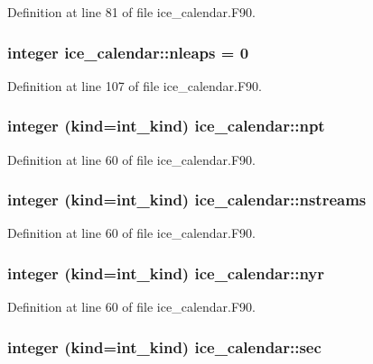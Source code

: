 Definition at line 81 of file ice\_\-calendar.F90.\hypertarget{namespaceice__calendar_a671fa04415abb84aa5564c9269f47f81}{
\subsubsection[{nleaps}]{\setlength{\rightskip}{0pt plus 5cm}integer {\bf ice\_\-calendar::nleaps} = 0}}
\label{namespaceice__calendar_a671fa04415abb84aa5564c9269f47f81}


Definition at line 107 of file ice\_\-calendar.F90.\hypertarget{namespaceice__calendar_aac483d802138fd2e80f1945fb3385f35}{
\subsubsection[{npt}]{\setlength{\rightskip}{0pt plus 5cm}integer (kind=int\_\-kind) {\bf ice\_\-calendar::npt}}}
\label{namespaceice__calendar_aac483d802138fd2e80f1945fb3385f35}


Definition at line 60 of file ice\_\-calendar.F90.\hypertarget{namespaceice__calendar_ae00ad28547110901c77d6d4f2d87a7ea}{
\subsubsection[{nstreams}]{\setlength{\rightskip}{0pt plus 5cm}integer (kind=int\_\-kind) {\bf ice\_\-calendar::nstreams}}}
\label{namespaceice__calendar_ae00ad28547110901c77d6d4f2d87a7ea}


Definition at line 60 of file ice\_\-calendar.F90.\hypertarget{namespaceice__calendar_ab1bfcde8457aafd600e9ff69b7ec6a3f}{
\subsubsection[{nyr}]{\setlength{\rightskip}{0pt plus 5cm}integer (kind=int\_\-kind) {\bf ice\_\-calendar::nyr}}}
\label{namespaceice__calendar_ab1bfcde8457aafd600e9ff69b7ec6a3f}


Definition at line 60 of file ice\_\-calendar.F90.\hypertarget{namespaceice__calendar_a80ddbc12ee9fd336c3148dd0e31f420c}{
\subsubsection[{sec}]{\setlength{\rightskip}{0pt plus 5cm}integer (kind=int\_\-kind) {\bf ice\_\-calendar::sec}}}
\label{namespaceice__calendar_a80ddbc12ee9fd336c3148dd0e31f420c}


